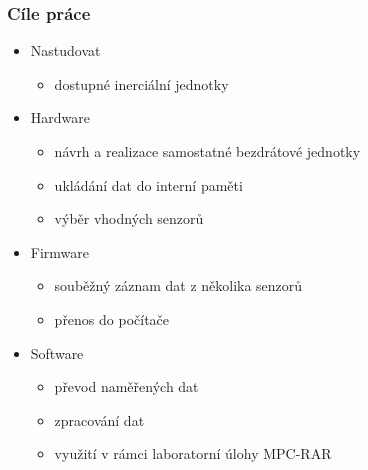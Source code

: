 \documentclass[%
  12pt,       				%
	t,                  %
	aspectratio=1610,   %
	unicode,						%
]{beamer}				    	%
\begin{document}
\disablenavigationsymbols

\maketitle

\begin{frame} 
	\frametitle{Cíle práce}
	\begin{itemize}
			\item Nastudovat
			\begin{itemize}
					\item dostupné inerciální jednotky
				\end{itemize}
			\item Hardware
				\begin{itemize}
					\item návrh a realizace samostatné bezdrátové jednotky
					\item ukládání dat do interní paměti
					\item výběr vhodných senzorů
				\end{itemize}
			\item Firmware
				\begin{itemize}
					\item souběžný záznam dat z několika senzorů
					\item přenos do počítače
				\end{itemize}	
							\item Software
				\begin{itemize}
					\item převod naměřených dat
					\item zpracování dat
					\item využití v rámci laboratorní úlohy MPC-RAR
				\end{itemize}

	\end{itemize}
\end{frame}
\end{document}
